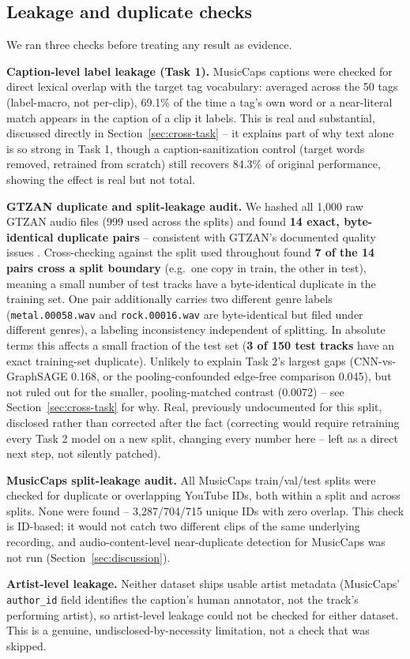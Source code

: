 \subsection{Leakage and duplicate checks}
We ran three checks before treating any result as evidence.

\textbf{Caption-level label leakage (Task 1).} MusicCaps captions were checked for direct
lexical overlap with the target tag vocabulary: averaged across the 50 tags (label-macro, not
per-clip), 69.1\% of the time a tag's own word or a near-literal match appears in the caption
of a clip it labels. This is real and substantial, discussed directly in
Section~\ref{sec:cross-task} -- it explains part of why text alone is so strong in Task 1,
though a caption-sanitization control (target words removed, retrained from scratch) still
recovers 84.3\% of original performance, showing the effect is real but not total.

\textbf{GTZAN duplicate and split-leakage audit.} We hashed all 1,000 raw GTZAN audio files
(999 used across the splits) and found \textbf{14 exact, byte-identical duplicate pairs} --
consistent with GTZAN's documented quality issues \cite{sturm2013gtzan}. Cross-checking
against the split used throughout found \textbf{7 of the 14 pairs cross a split boundary}
(e.g.\ one copy in train, the other in test), meaning a small number of test tracks have a
byte-identical duplicate in the training set. One pair additionally carries two different
genre labels (\texttt{metal.00058.wav} and \texttt{rock.00016.wav} are byte-identical but
filed under different genres), a labeling inconsistency independent of splitting. In absolute
terms this affects a small fraction of the test set (\textbf{3 of 150 test tracks} have an
exact training-set duplicate). Unlikely to explain Task 2's largest gaps (CNN-vs-GraphSAGE
0.168, or the pooling-confounded edge-free comparison 0.045), but not ruled out for the
smaller, pooling-matched contrast (0.0072) -- see Section~\ref{sec:cross-task} for why. Real,
previously undocumented for this split, disclosed rather than corrected after the fact
(correcting would require retraining every Task 2 model on a new split, changing every
number here -- left as a direct next step, not silently patched).

\textbf{MusicCaps split-leakage audit.} All MusicCaps train/val/test splits were checked for
duplicate or overlapping YouTube IDs, both within a split and across splits. None were found
-- 3,287/704/715 unique IDs with zero overlap. This check is ID-based; it would not catch two
different clips of the same underlying recording, and audio-content-level near-duplicate
detection for MusicCaps was not run (Section~\ref{sec:discussion}).

\textbf{Artist-level leakage.} Neither dataset ships usable artist metadata (MusicCaps'
\texttt{author\_id} field identifies the caption's human annotator, not the track's
performing artist), so artist-level leakage could not be checked for either dataset. This is
a genuine, undisclosed-by-necessity limitation, not a check that was skipped.
